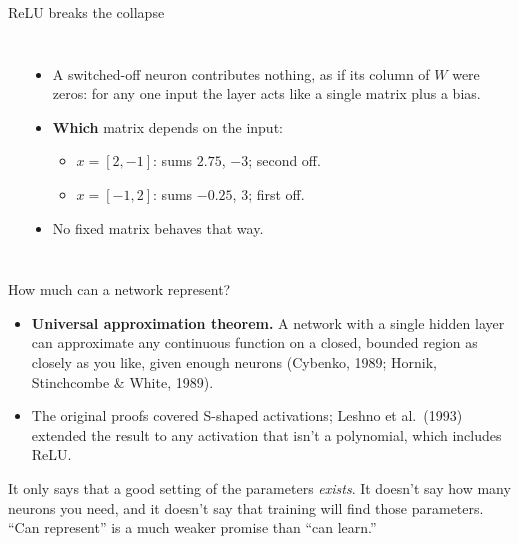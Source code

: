 \documentclass[aspectratio=169,11pt,t,\primeropts]{beamer}
\begin{document}
\begin{frame}{ReLU breaks the collapse}
  \begin{columns}[c]
    \begin{center}
    \end{center}
    \small
    \begin{itemize}
      \item A switched-off neuron contributes nothing, as if its column of $W$ were zeros: for
        any one input the layer acts like a single matrix plus a bias.
      \item<2-> \textbf{Which} matrix depends on the input:
        \begin{itemize}
          \item $x = [2, -1]$: sums $2.75$, $-3$; second off.
          \item $x = [-1, 2]$: sums $-0.25$, $3$; first off.
        \end{itemize}
      \item<3-> No fixed matrix behaves that way.
    \end{itemize}
  \end{columns}
\end{frame}

\begin{frame}{How much can a network represent?}
  \begin{itemize}
    \item \textbf{Universal approximation theorem.} A network with a single hidden layer can
      approximate any continuous function on a closed, bounded region as closely as you like,
      given enough neurons (Cybenko, 1989; Hornik, Stinchcombe \& White, 1989).
    \item The original proofs covered S-shaped activations; Leshno et al.\ (1993) extended the
      result to any activation that isn't a polynomial, which includes ReLU.
  \end{itemize}
  \pause
  \begin{keyidea}
    It only says that a good setting of the parameters \emph{exists}. It doesn't say how many
    neurons you need, and it doesn't say that training will find those parameters.
    ``Can represent'' is a much weaker promise than ``can learn.''
  \end{keyidea}
\end{frame}
\end{document}
